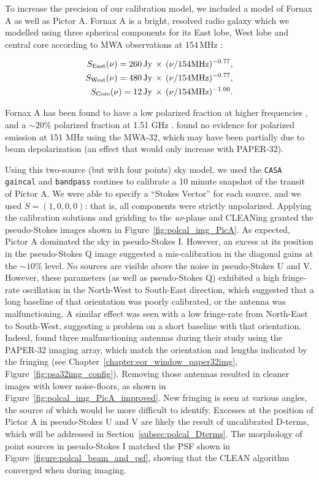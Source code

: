 To increase the precision of our calibration model, we included a model of Fornax A as well as Pictor A. Fornax A is a bright, resolved radio galaxy which we modelled using three spherical components for its East lobe, West lobe and central core according to MWA observations at 154\,MHz \citep{McKinley.15}:

\begin{eqnarray}
S_{\rm East}(\nu)= 260\,{\rm Jy}\,\times\,(\nu/154{\rm MHz})^{- 0.77},\\
S_{\rm West}(\nu)= 480\,{\rm Jy}\,\times\,(\nu/154{\rm MHz})^{- 0.77},\\
S_{\rm Core}(\nu)= 12\,{\rm Jy}\,\times\,(\nu/154{\rm MHz})^{- 1.00}.\\
\end{eqnarray}

Fornax A has been found to have a low polarized fraction at higher frequencies \citep[20 GHz][]{Lopez-Caniego.09}, and a $\sim20$\% polarized fraction at 1.51 GHz \citep{Fomalont.89}. \cite{Bernardi.13} found no evidence for polarized emission at 151 MHz using the MWA-32, which may have been partially due to beam depolarization (an effect that would only increase with PAPER-32).

Using this two-source (but with four points) sky model, we used the {\tt CASA} {\tt gaincal} and {\tt bandpass} routines to calibrate a 10 minute snapshot of the transit of Pictor A. We were able to specify a ``Stokes Vector'' for each source, and we used $S=(1,0,0,0)$: that is, all components were strictly unpolarized. Applying the calibration solutions and gridding to the \textit{uv}-plane and CLEANing granted the pseudo-Stokes images shown in Figure~\ref{fig:polcal_img_PicA}. As expected, Pictor A dominated the sky in pseudo-Stokes I. However, an excess at its position in the pseudo-Stokes Q image suggested a mis-calibration in the diagonal gains at the $\sim10$\% level. No sources are visible above the noise in pseudo-Stokes U and V. However, these parameters (as well as pseudo-Stokes Q) exhibited a high fringe-rate oscillation in the North-West to South-East direction, which suggested that a long baseline of that orientation was poorly calibrated, or the antenna was malfunctioning. A similar effect was seen with a low fringe-rate from North-East to South-West, suggesting a problem on a short baseline with that orientation. Indeed, \cite{Kohn.16} found three malfunctioning antennas during their study using the PAPER-32 imaging array, which match the orientation and lengths indicated by the fringing (see Chapter~\ref{chapter:eor_window_paper32img}, Figure~\ref{fig:psa32img_config}). Removing those antennas resulted in cleaner images with lower noise-floors, as shown in Figure~\ref{fig:polcal_img_PicA_improved}. New fringing is seen at various angles, the source of which would be more difficult to identify. Excesses at the position of Pictor A in pseudo-Stokes U and V are likely the result of uncalibrated D-terms, which will be addressed in Section~\ref{subsec:polcal_Dterms}.
The morphology of point sources in pseudo-Stokes I matched the PSF shown in Figure~\ref{figure:polcal_beam_and_psf}, showing that the CLEAN algorithm converged when during imaging.

